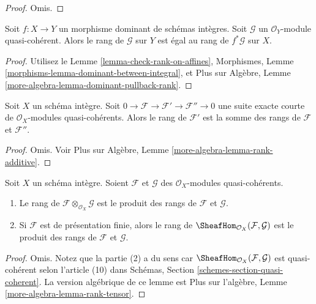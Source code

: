\begin{proof}
Omis.
\end{proof}

\begin{lemma}
\label{lemma-dominant-pullback-rank}
Soit  $f : X \to Y$  un morphisme dominant de schémas intègres. Soit  $\mathcal{G}$  un
 $\mathcal{O}_Y$-module quasi-cohérent. Alors le rang de  $\mathcal{G}$  sur  $Y$ 
est égal au rang de  $f^*\mathcal{G}$  sur  $X$.
\end{lemma}

\begin{proof}
Utilisez le Lemme  \ref{lemma-check-rank-on-affines}, Morphismes, Lemme  \ref{morphisms-lemma-dominant-between-integral}, et Plus sur
Algèbre, Lemme  \ref{more-algebra-lemma-dominant-pullback-rank}.
\end{proof}

\begin{lemma}
\label{lemma-rank-additive}
Soit  $X$  un schéma intègre. Soit  $0 \to \mathcal{F} \to \mathcal{F}' \to \mathcal{F}'' \to 0$  une suite exacte courte de
 $\mathcal{O}_X$-modules quasi-cohérents. Alors le rang de  $\mathcal{F}'$  est la somme
des rangs de  $\mathcal{F}$  et  $\mathcal{F}''$.
\end{lemma}

\begin{proof}
Omis. Voir Plus sur Algèbre, Lemme  \ref{more-algebra-lemma-rank-additive}.
\end{proof}

\begin{lemma}
\label{lemma-rank-tensor}
Soit  $X$  un schéma intègre. Soient  $\mathcal{F}$  et  $\mathcal{G}$  des
 $\mathcal{O}_X$-modules quasi-cohérents.
\begin{enumerate}
\item Le rang de  $\mathcal{F} \otimes_{\mathcal{O}_X} \mathcal{G}$  est le produit des rangs de  $\mathcal{F}$  et  $\mathcal{G}$.
\item Si  $\mathcal{F}$  est de présentation finie, alors le rang de  $\SheafHom_{\mathcal{O}_X}(\mathcal{F}, \mathcal{G})$  est le
produit des rangs de  $\mathcal{F}$  et  $\mathcal{G}$.
\end{enumerate}
\end{lemma}

\begin{proof}
Omis. Notez que la partie (2) a du sens car  $\SheafHom_{\mathcal{O}_X}(\mathcal{F}, \mathcal{G})$  est quasi-cohérent selon
l'article (10) dans Schémas, Section  \ref{schemes-section-quasi-coherent}. La version algébrique de ce
lemme est Plus sur l’algèbre, Lemme  \ref{more-algebra-lemma-rank-tensor}.
\end{proof}

